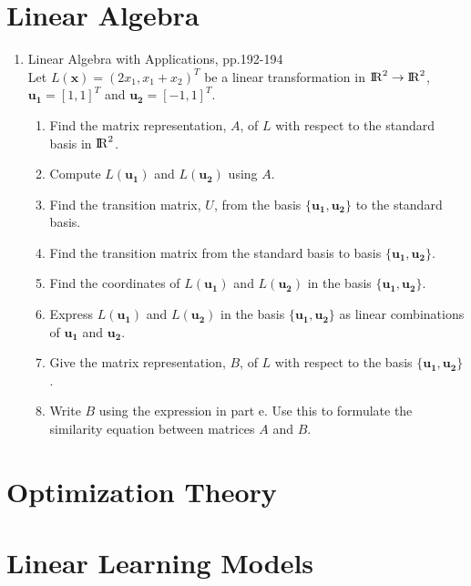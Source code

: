\documentclass[12pt]{article}
\theoremstyle{definition}
\begin{document}
\section{Linear Algebra}
\begin{enumerate}
	\item Linear Algebra with Applications, pp.192-194\\
	Let $L(\mathbf{x})=(2x_{1},x_{1}+x_{2})^{T}$ be a linear transformation 
	in ${\rm I\!R}^{2} \rightarrow {\rm I\!R}^{2}$, 
	$\mathbf{u_{1}} = \left[ 1,1 \right]^{T}$ and 
	$\mathbf{u_{2}} = \left[ -1,1\right]^{T}$. 
	\begin{enumerate}
		\item Find the matrix representation, $A$, of $L$ with respect to 
		the standard basis in ${\rm I\!R}^{2}$.
		\item Compute $L(\mathbf{u_{1}})$ and $L(\mathbf{u_{2}})$ 
		using $A$.
		\item Find the transition matrix, $U$, from the basis  
		$\{\mathbf{u_{1}}, \mathbf{u_{2}}\}$ to the standard basis.
		\item Find the transition matrix from the standard basis to basis 
		$\{\mathbf{u_{1}}, \mathbf{u_{2}}\}$.
		\item Find the coordinates of $L(\mathbf{u_{1}})$ and $L(\mathbf{u_{2}})$ 
		in the basis $\{\mathbf{u_{1}}, \mathbf{u_{2}}\}$.
		\item Express $L(\mathbf{u_{1}})$ and $L(\mathbf{u_{2}})$ in the basis 
		$\{\mathbf{u_{1}}, \mathbf{u_{2}}\}$ as linear combinations of 
		$\mathbf{u_{1}}$ and $\mathbf{u_{2}}$.
		\item Give the matrix representation, $B$, of $L$ with respect 
		to the basis $\{\mathbf{u_{1}},\mathbf{u_{2}}\}$.
		\item Write $B$ using the expression in part e. Use this to formulate 
		the similarity equation between matrices $A$ and $B$.
	\end{enumerate}
\end{enumerate}










\section{Optimization Theory}
\section{Linear Learning Models}
\end{document}
